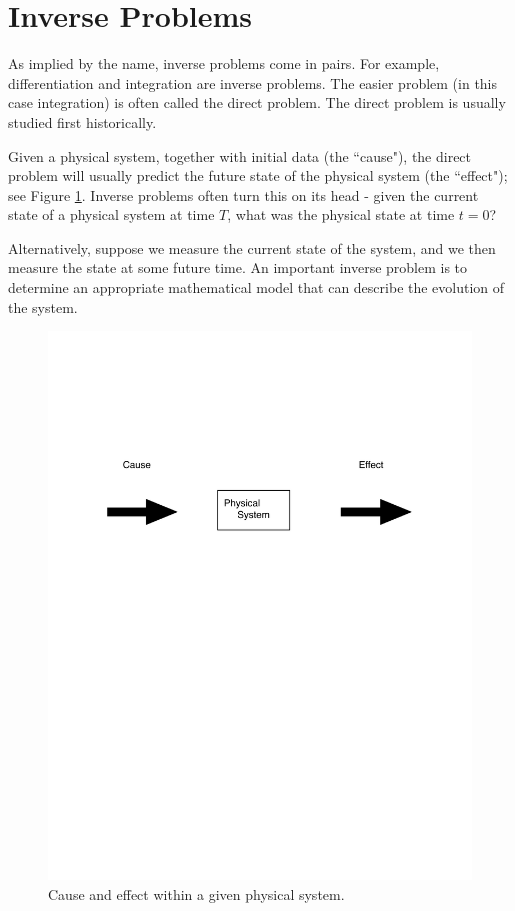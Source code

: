 \section*{Inverse Problems}
As implied by the name, inverse problems come in pairs. For example, differentiation and integration are inverse problems. The easier problem (in this case integration) is often called the direct problem. The direct problem is usually studied first historically.

Given a physical system, together with initial data (the ``cause"), the direct problem will usually predict the future state of the physical system (the ``effect"); see Figure \ref{fig:cause_and_effect}.  Inverse problems often turn this on its head - given the current state of a physical system at time $T$, what was the physical state at time $t = 0$?  

Alternatively, suppose we measure the current state of the system, and we then measure the state at some future time. An important inverse problem is to determine an appropriate mathematical model that can describe the evolution of the system.



\begin{figure}
\centering
\includegraphics[width=\textwidth]{cause_and_effect.pdf}
\caption{Cause and effect within a given physical system.}
\label{fig:cause_and_effect}
\end{figure}

